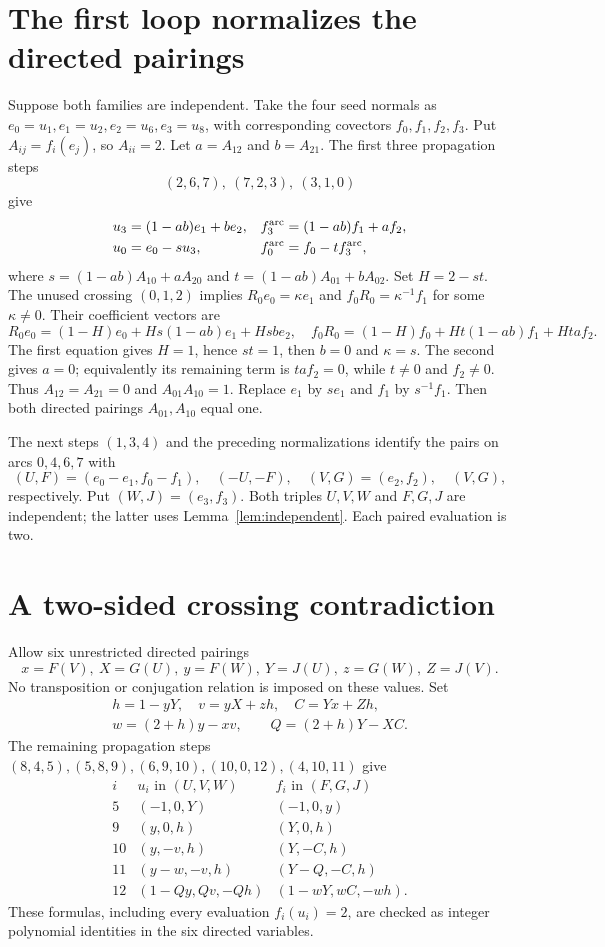 \documentclass[11pt]{article}
\begin{document}
\section{The first loop normalizes the directed pairings}

Suppose both families are independent. Take the four seed normals
as $e_0=u_1,e_1=u_2,e_2=u_6,e_3=u_8$, with corresponding covectors
$f_0,f_1,f_2,f_3$. Put $A_{ij}=f_i(e_j)$, so $A_{ii}=2$.
Let $a=A_{12}$ and $b=A_{21}$. The first three propagation steps
\[
                 (2,6,7),\ (7,2,3),\ (3,1,0)
\]
give
\[
\begin{aligned}
 u_3&=(1-ab)e_1+be_2,& f_3^{\rm arc}&=(1-ab)f_1+af_2,\\
 u_0&=e_0-su_3,& f_0^{\rm arc}&=f_0-tf_3^{\rm arc},
\end{aligned}
\]
where $s=(1-ab)A_{10}+aA_{20}$ and
$t=(1-ab)A_{01}+bA_{02}$.
Set $H=2-st$. The unused crossing $(0,1,2)$ implies
$R_0e_0=\kappa e_1$ and $f_0R_0=\kappa^{-1}f_1$
for some $\kappa\ne0$. Their coefficient vectors are
\[
 R_0e_0=(1-H)e_0+Hs(1-ab)e_1+Hsbe_2,
\quad
 f_0R_0=(1-H)f_0+Ht(1-ab)f_1+Htaf_2.
\]
The first equation gives $H=1$, hence $st=1$, then $b=0$
and $\kappa=s$. The second gives $a=0$; equivalently its
remaining term is $ta f_2=0$, while $t\ne0$ and $f_2\ne0$.
Thus $A_{12}=A_{21}=0$ and $A_{01}A_{10}=1$.
Replace $e_1$ by $se_1$ and $f_1$ by $s^{-1}f_1$.
Then both directed pairings $A_{01},A_{10}$ equal one.

The next steps $(1,3,4)$ and the preceding normalizations identify
the pairs on arcs $0,4,6,7$ with
\[
 (U,F)=(e_0-e_1,f_0-f_1),\quad(-U,-F),\quad
 (V,G)=(e_2,f_2),\quad(V,G),
\]
respectively. Put $(W,J)=(e_3,f_3)$.
Both triples $U,V,W$ and $F,G,J$ are independent; the latter
uses Lemma~\ref{lem:independent}. Each paired evaluation is two.

\section{A two-sided crossing contradiction}

Allow six unrestricted directed pairings
\[
 x=F(V),\ X=G(U),\ y=F(W),\ Y=J(U),\ z=G(W),\ Z=J(V).
\]
No transposition or conjugation relation is imposed on these values.
Set
\[
\begin{gathered}
 h=1-yY,\quad v=yX+zh,\quad C=Yx+Zh,\\
 w=(2+h)y-xv,\qquad Q=(2+h)Y-XC.
\end{gathered}
\]
The remaining propagation steps
$(8,4,5),(5,8,9),(6,9,10),(10,0,12),(4,10,11)$ give
\[
\begin{array}{c|c|c}
 i&u_i\text{ in }(U,V,W)&f_i\text{ in }(F,G,J)\\\hline
5&(-1,0,Y)&(-1,0,y)\\
9&(y,0,h)&(Y,0,h)\\
10&(y,-v,h)&(Y,-C,h)\\
11&(y-w,-v,h)&(Y-Q,-C,h)\\
12&(1-Qy,Qv,-Qh)&(1-wY,wC,-wh).
\end{array}
\]
These formulas, including every evaluation $f_i(u_i)=2$, are
checked as integer polynomial identities in the six directed variables.
\end{document}
